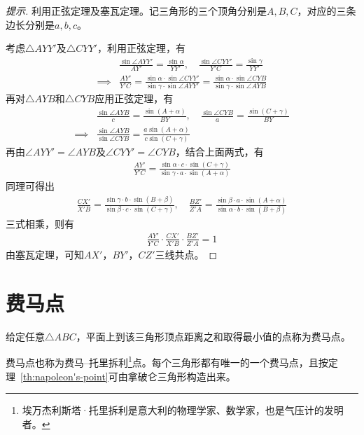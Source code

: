 \begin{proof}[提示]利用正弦定理及塞瓦定理。记三角形的三个顶角分别是$A,B,C$，对应的三条边长分别是$a,b,c$。

  考虑$\triangle AYY'$及$\triangle CYY'$，利用正弦定理，有
  \begin{align*}
    &\frac{\sin\angle AYY'}{AY'} = \frac{\sin\alpha}{YY'}, \quad
      \frac{\sin\angle CYY'}{Y'C} = \frac{\sin\gamma}{YY'}\\[3pt]
    \implies& \frac{AY'}{Y'C} = \frac{\sin\alpha\cdot \sin\angle CYY'}{\sin\gamma\cdot\sin\angle AYY'}
              = \frac{\sin\alpha\cdot \sin\angle CYB}{\sin\gamma\cdot\sin\angle AYB}
  \end{align*}
  再对$\triangle AYB$和$\triangle CYB$应用正弦定理，有
  \begin{align*}
    &\frac{\sin\angle AYB}{c}=\frac{\sin(A+\alpha)}{BY},\quad
      \frac{\sin\angle CYB}{a}=\frac{\sin(C+\gamma)}{BY}\\
    \implies& \frac{\sin\angle AYB}{\sin\angle CYB}=\frac{a\sin(A+\alpha)}{c\sin(C+\gamma)}
  \end{align*}
  再由$\angle AYY' = \angle AYB$及$\angle CYY'=\angle CYB$，结合上面两式，有
  \begin{align*}
    \frac{AY'}{Y'C} = \frac{\sin\alpha\cdot c\cdot\sin(C+\gamma)}{\sin\gamma\cdot a\cdot\sin(A+\alpha)}
  \end{align*}
  同理可得出
  \begin{align*}
    \frac{CX'}{X'B}=\frac{\sin\gamma\cdot b\cdot\sin(B+\beta)}{\sin\beta\cdot c\cdot\sin(C+\gamma)},\quad
    \frac{BZ'}{Z'A}=\frac{\sin\beta\cdot a\cdot\sin(A+\alpha)}{\sin\alpha\cdot b\cdot\sin(B+\beta)}
  \end{align*}
  三式相乘，则有
  \begin{align*}
    \frac{AY'}{Y'C}\cdot\frac{CX'}{X'B}\cdot\frac{BZ'}{Z'A}=1
  \end{align*}
  由塞瓦定理，可知$AX'$，$BY'$，$CZ'$三线共点。
\end{proof}

\section{费马点}
\label{sec:fermat-point}

\begin{definition}
  给定任意$\triangle ABC$，平面上到该三角形顶点距离之和取得最小值的点称为费马点。
\end{definition}
费马点也称为费马--托里拆利\footnote{埃万杰利斯塔·托里拆利是意大利的物理学家、数学家，也是气压计的发明者。}点。每个三角形都有唯一的一个费马点，且按定理~\ref{th:napoleon's-point}可由拿破仑三角形构造出来。

